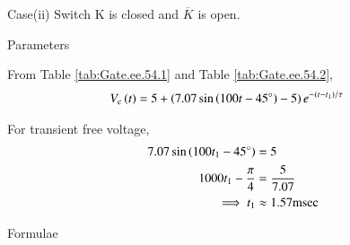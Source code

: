 \documentclass[journal,12pt,twocolumn]{IEEEtran}
\begin{document}
\newpage
Case(ii) Switch K is closed and $\overline{K}$ is open.

\begin{figure}[h!]
  \centering
  \resizebox{0.55\columnwidth}{!}{}
\end{figure}

\begin{table}[ht]
    
    \caption{Parameters}
    \label{tab:Gate.ee.54.1}
\end{table}

From Table \ref{tab:Gate.ee.54.1} and Table \ref{tab:Gate.ee.54.2},
\begin{align}
    V_c\left(t\right) &= 5 + \left(7.07\sin \left(100t - 45^\circ\right)-5\right)e^{-\left(t-t_1\right)/ \tau}
\end{align}

For transient free voltage,
\begin{align}
    7.07\sin \left(100t_1 - 45^\circ\right) &= 5\\
    1000t_1 - \frac{\pi}{4} &= \frac{5}{7.07}\\
    \implies t_1 &\approx 1.57 \text{msec}
\end{align}

\begin{table}[ht]
    
    \caption{Formulae}
    \label{tab:Gate.ee.54.2}
\end{table}
\end{document}
